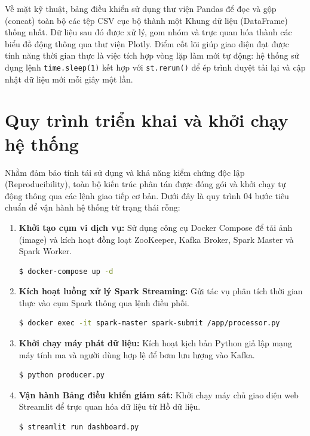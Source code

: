 \documentclass[12pt,a4paper]{report}
\begin{document}
Về mặt kỹ thuật, bảng điều khiển sử dụng thư viện Pandas để đọc và gộp (concat) toàn bộ các tệp CSV cục bộ thành một Khung dữ liệu (DataFrame) thống nhất. Dữ liệu sau đó được xử lý, gom nhóm và trực quan hóa thành các biểu đồ động thông qua thư viện Plotly. Điểm cốt lõi giúp giao diện đạt được tính năng thời gian thực là việc tích hợp vòng lặp làm mới tự động: hệ thống sử dụng lệnh \texttt{time.sleep(1)} kết hợp với \texttt{st.rerun()} để ép trình duyệt tải lại và cập nhật dữ liệu mới mỗi giây một lần.

\section{Quy trình triển khai và khởi chạy hệ thống}
Nhằm đảm bảo tính tái sử dụng và khả năng kiểm chứng độc lập (Reproducibility), toàn bộ kiến trúc phân tán được đóng gói và khởi chạy tự động thông qua các lệnh giao tiếp cơ bản. Dưới đây là quy trình 04 bước tiêu chuẩn để vận hành hệ thống từ trạng thái rỗng:

\begin{enumerate}
    \item \textbf{Khởi tạo cụm vi dịch vụ:} Sử dụng công cụ Docker Compose để tải ảnh (image) và kích hoạt đồng loạt ZooKeeper, Kafka Broker, Spark Master và Spark Worker.
    \begin{lstlisting}[language=bash]
$ docker-compose up -d
    \end{lstlisting}
    \item \textbf{Kích hoạt luồng xử lý Spark Streaming:} Gửi tác vụ phân tích thời gian thực vào cụm Spark thông qua lệnh điều phối.
    \begin{lstlisting}[language=bash]
$ docker exec -it spark-master spark-submit /app/processor.py
    \end{lstlisting}
    \item \textbf{Khởi chạy máy phát dữ liệu:} Kích hoạt kịch bản Python giả lập mạng máy tính ma và người dùng hợp lệ để bơm lưu lượng vào Kafka.
    \begin{lstlisting}[language=bash]
$ python producer.py
    \end{lstlisting}
    \item \textbf{Vận hành Bảng điều khiển giám sát:} Khởi chạy máy chủ giao diện web Streamlit để trực quan hóa dữ liệu từ Hồ dữ liệu.
    \begin{lstlisting}[language=bash]
$ streamlit run dashboard.py
    \end{lstlisting}
\end{enumerate}
\end{document}
